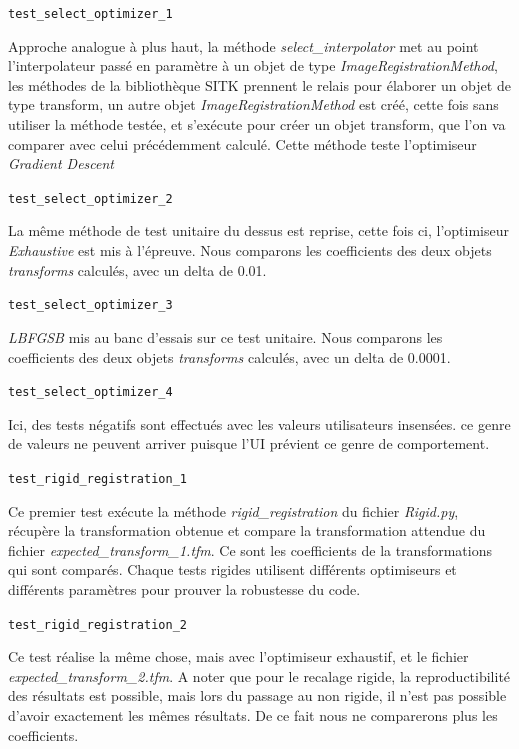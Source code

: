 \documentclass{article}
\newcommand{\method}[1]{\hspace{1in}\texttt{#1}\bigskip}
\begin{document}
{{{            \bigskip
            \method{test\_select\_optimizer\_1}

            Approche analogue à plus haut, la méthode \textit{select\_interpolator} met au point l'interpolateur passé en paramètre à un objet de type \textit{ImageRegistrationMethod}, les méthodes de la bibliothèque SITK prennent le relais pour élaborer un objet de type transform, un autre objet \textit{ImageRegistrationMethod} est créé, cette fois sans utiliser la méthode testée, et s'exécute pour créer un objet transform, que l'on va comparer avec celui précédemment calculé. Cette méthode teste l'optimiseur \textit{Gradient Descent}

            \bigskip
            \method{test\_select\_optimizer\_2}

            La même méthode de test unitaire du dessus est reprise, cette fois ci, l'optimiseur \textit{Exhaustive} est mis à l'épreuve. Nous comparons les coefficients des deux objets \textit{transforms} calculés, avec un delta de 0.01.

            \bigskip
            \method{test\_select\_optimizer\_3}

            \textit{LBFGSB} mis au banc d'essais sur ce test unitaire. Nous comparons les coefficients des deux objets \textit{transforms} calculés, avec un delta de 0.0001.

            \bigskip
            \method{test\_select\_optimizer\_4}

            Ici, des tests négatifs sont effectués avec les valeurs utilisateurs insensées. ce genre de valeurs ne peuvent arriver puisque l'UI prévient ce genre de comportement.

            \bigskip
            \method{test\_rigid\_registration\_1}

            Ce premier test exécute la méthode \textit{rigid\_registration} du fichier \textit{Rigid.py}, récupère la transformation obtenue et compare la transformation attendue du fichier \textit{expected\_transform\_1.tfm}. Ce sont les coefficients de la transformations qui sont comparés. Chaque tests rigides utilisent différents optimiseurs et différents paramètres pour prouver la robustesse du code.

            \bigskip
            \method{test\_rigid\_registration\_2}

            Ce test réalise la même chose, mais avec l'optimiseur exhaustif, et le fichier \textit{expected\_transform\_2.tfm}. A noter que pour le recalage rigide, la reproductibilité des résultats est possible, mais lors du passage au non rigide, il n'est pas possible d'avoir exactement les mêmes résultats. De ce fait nous ne comparerons plus les coefficients.

}}}
\end{document}
